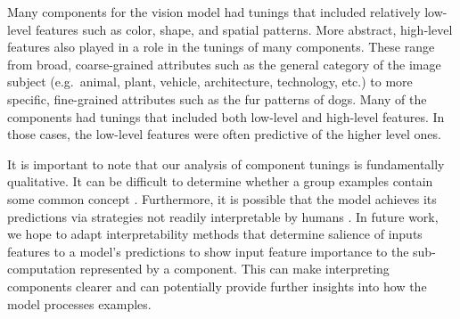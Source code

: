 \documentclass[dvipsnames]{article}
\begin{document}
Many components for the vision model had tunings that included relatively low-level features such as color, shape, and spatial patterns.
More abstract, high-level features also played in a role in the tunings of many components.
These range from broad, coarse-grained attributes such as the general category of the image subject (e.g.\ animal, plant, vehicle, architecture, technology, etc.) to more specific, fine-grained attributes such as the fur patterns of dogs.
Many of the components had tunings that included both low-level and high-level features.
In those cases, the low-level features were often predictive of the higher level ones.

It is important to note that our analysis of component tunings is fundamentally qualitative.
It can be difficult to determine whether a group examples contain some common concept \citep{bolukbasi2021interpretability}.
Furthermore, it is possible that the model achieves its predictions via strategies not readily interpretable by humans \citep{dalvi2022discovering}.
In future work, we hope to adapt interpretability methods that determine salience of inputs features to a model's predictions to show input feature importance to the sub-computation represented by a component.
This can make interpreting components clearer and can potentially provide further insights into how the model processes examples.




\end{document}
